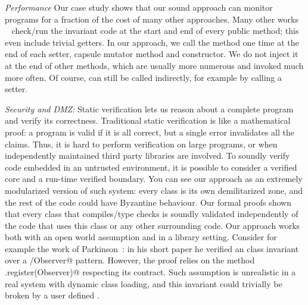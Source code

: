 \noindent\textit{Performance}
Our case study shows that our sound approach can monitor programs
for a fraction of the cost of many other approaches.
Many other works%
~\cite{feldman2006jose,fahndrich2010embedded,abercrombie2002jcontractor,tran2003design}
 check/run
the invariant code at the start and end of every public
method; this even include trivial getters.
In  our approach, we call the \validate{} method
one time at the end of each setter, capsule mutator method and constructor.
We do not inject it at the end of other methods, which are usually more numerous and invoked much more often.
Of course, \validate{} can still be called indirectly, for example by calling a setter.





\noindent\textit{Security and DMZ:}
Static verification lets us reason about a complete program
and verify its correctness.
Traditional static verification is like a mathematical proof: a program is valid if it is all correct,
but a single error invalidates all the claims.
Thus, it is hard to perform verification on large programs, or when independently
maintained third party libraries are involved.
To soundly verify code embedded in an untrusted 
environment, it is possible to 
consider a verified core
and a run-time verified boundary.
You can see our approach as an extremely modularized version of such system:
every class is its own demilitarized zone, and the rest of the code 
could have Byzantine behaviour.
Our formal proofs 
shown that every class that compiles/type checks is soundly validated
independently of the code that uses this class or any other surrounding code.
Our approach works both with an open world assumption and in a library setting.
Consider for example the work of Parkinson~\cite{parkinson2007class}:
in his short paper he verified an \Q@Observer@ class invariant over
a \Q@Subject/Observer@ pattern.
However, the proof relies on the method \Q@Subject.register(Observer)@ respecting its contract.
Such assumption is unrealistic in a real system with dynamic class loading,
and this invariant could trivially be broken by a user defined \Q@EvilSubject@.


